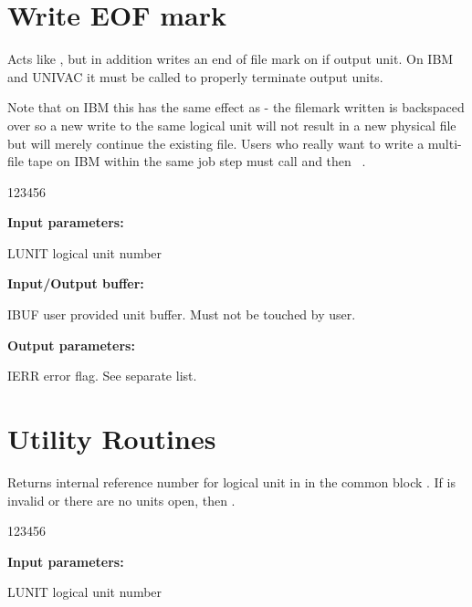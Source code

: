 \section{Write EOF mark}


 
Acts like , but in addition writes an end of file mark on
 if output unit. On IBM and UNIVAC it must be called
to properly terminate output units.
 
Note that on IBM this has the same effect as  - the filemark
written is backspaced over so a new write to the same logical unit
will not result in a new physical file but will merely continue the
existing file. Users who really want to write a multi-file tape on
IBM within the same job step must call  and then 
~\cite{bib-IOPACK}.

\begin{DLtt}{123456}
\item[{\rm\bf Input parameters:}]
\item[LUNIT] logical unit number
\item[{\rm\bf Input/Output buffer:}]
\item[IBUF] user provided unit buffer. Must not be touched by user.\\
\item[{\rm\bf Output parameters:}]
\item[IERR] error flag. See separate list.
\end{DLtt}

\section{Utility Routines}

 
Returns internal reference number for logical unit in  in the
common block . 
If  is invalid or there are no units
open, then .

\begin{DLtt}{123456}
\item[{\rm\bf Input parameters:}]
\item[LUNIT] logical unit number
\end{DLtt}

